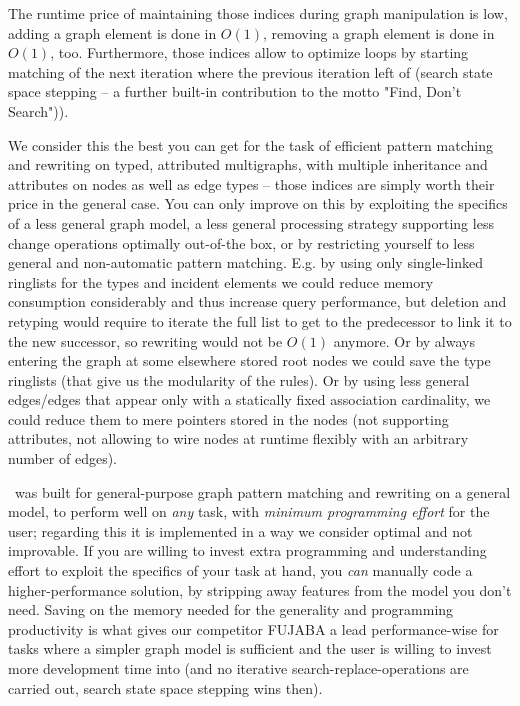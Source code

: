 The runtime price of maintaining those indices during graph manipulation is low, adding a graph element is done in $O(1)$, removing a graph element is done in $O(1)$, too. 
Furthermore, those indices allow to optimize loops by starting matching of the next iteration where the previous iteration left of (search state space stepping -- a further built-in contribution to the motto "Find, Don't Search")).

We consider this the best you can get for the task of efficient pattern matching and rewriting on typed, attributed multigraphs, with multiple inheritance and attributes on nodes as well as edge types -- those indices are simply worth their price in the general case.
You can only improve on this by exploiting the specifics of a less general graph model, a less general processing strategy supporting less change operations optimally out-of-the box, or by restricting yourself to less general and non-automatic pattern matching.
E.g. by using only single-linked ringlists for the types and incident elements we could reduce memory consumption considerably and thus increase query performance, but deletion and retyping would require to iterate the full list to get to the predecessor to link it to the new successor, so rewriting would not be $O(1)$ anymore.
Or by always entering the graph at some elsewhere stored root nodes we could save the type ringlists (that give us the modularity of the rules).
Or by using less general edges/edges that appear only with a statically fixed association cardinality, we could reduce them to mere pointers stored in the nodes (not supporting attributes, not allowing to wire nodes at runtime flexibly with an arbitrary number of edges).

\GrG\ was built for general-purpose graph pattern matching and rewriting on a general model, to perform well on \emph{any} task, with \emph{minimum programming effort} for the user; regarding this it is implemented in a way we consider optimal and not improvable.
If you are willing to invest extra programming and understanding effort to exploit the specifics of your task at hand, you \emph{can} manually code a higher-performance solution, by stripping away features from the model you don't need.
Saving on the memory needed for the generality and programming productivity is what gives our competitor FUJABA a lead performance-wise for tasks where a simpler graph model is sufficient and the user is willing to invest more development time into (and no iterative search-replace-operations are carried out, search state space stepping wins then).

